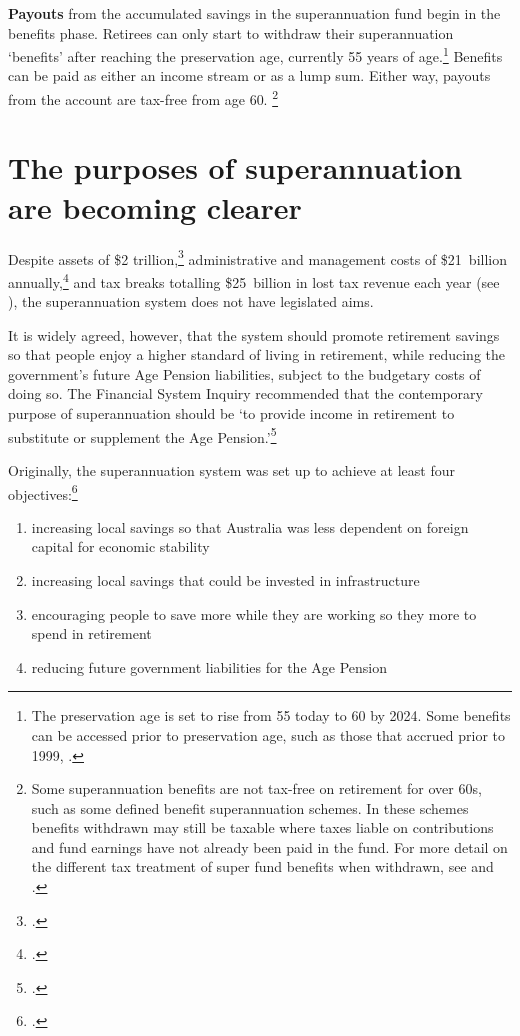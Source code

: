  \textbf{Payouts} from the accumulated savings in the superannuation fund begin in the benefits phase.  Retirees can only start to withdraw their superannuation ‘benefits’ after reaching the preservation age, currently 55 years of age.\footnote{The preservation age is set to rise from 55 today to 60 by 2024. Some benefits can be accessed prior to preservation age, such as those that accrued prior to 1999, \textcite{ATO2015WhenYouCanAccessYourSuper}.} Benefits can be paid as either an income stream or as a lump sum. Either way, payouts from the account are tax-free from age 60.%
 \footnote{Some superannuation benefits are not tax-free on retirement for over 60s, such as some defined benefit superannuation schemes. In these schemes benefits withdrawn may still be taxable where taxes liable on contributions and fund earnings have not already been paid in the fund. For more detail on the different tax treatment of super fund benefits when withdrawn, see \textcite{ATO2015HowTaxAppliesToSuper} and \textcite[][13]{Mercer2015SubmissionToReThink}.}

\FloatBarrier
 \section{The purposes of superannuation are becoming clearer}
 Despite assets of \$2 trillion,\footcite{APRA2015JuneSuperPerformance} administrative and management costs of \$21~billion annually,\footcite{MinifieSavageCameron2015} and tax breaks totalling \$25~billion in lost tax revenue each year (see ), the superannuation system does not have legislated aims. 

It is widely agreed, however, that the system should promote retirement savings so that people enjoy a higher standard of living in retirement, while reducing the government’s future Age Pension liabilities, subject to the budgetary costs of doing so. The Financial System Inquiry recommended that the contemporary purpose of superannuation should be ‘to provide income in retirement to substitute or supplement the Age Pension.’\footcite[][95]{FinancialSystemsInquiry2015}

 Originally, the superannuation system was set up to achieve at least four objectives:\footcite{Greenwood2010}
 \begin{enumerate}[rightmargin=0.2em]
\item increasing local savings so that Australia was less dependent on foreign capital for economic stability
\item increasing local savings that could be invested in infrastructure
\item encouraging people to save more while they are working so they more to spend in retirement
\item reducing future government liabilities for the Age Pension
 \end{enumerate}

